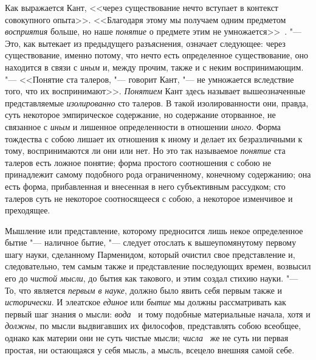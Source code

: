 Как выражается Кант, <<через существование нечто вступает в контекст
совокупного опыта>>. <<Благодаря этому мы получаем одним предметом
{\em восприятия} больше, но наше
{\em понятие} о предмете этим не
умножается>>~. "--- Это, как вытекает из предыдущего
разъяснения, означает следующее: через существование, именно потому, что
нечто есть определенное существование, оно находится в связи с
{\em иным} и, между прочим, также и с неким
воспринимающим. "--- <<Понятие ста талеров, "--- говорит Кант, "--- не умножается
вследствие того, что их воспринимают>>. {\em Понятием}
Кант здесь называет вышеозначенные представляемые
{\em изолированно} сто талеров. В такой изолированности
они, правда, суть некоторое эмпирическое содержание, но содержание
оторванное, не связанное с {\em иным} и лишенное
определенности в отношении {\em иного}. Форма
тождества с собою лишает их отношения к иному и делает их безразличными к
тому, воспринимаются ли они или нет. Но это так называемое
{\em понятие} ста талеров есть ложное понятие; форма
простого соотношения с собою не принадлежит самому подобного рода
ограниченному, конечному содержанию; она есть форма, прибавленная и
внесенная в него субъективным рассудком; сто талеров суть не некоторое
соотносящееся с собою, а некоторое изменчивое и преходящее.

Мышление или представление, которому предносится лишь некое определенное
бытие "--- наличное бытие, "--- следует отослать к вышеупомянутому первому шагу
науки, сделанному Парменидом, который очистил свое представление и,
следовательно, тем самым также и представление последующих времен, возвысил
его до {\em чистой мысли}, до бытия как такового, и
этим создал стихию науки. "--- То, что является
{\em первым в науке}, должно было явить себя первым
также и {\em исторически}. И элеатское
{\em единое} или {\em бытие} мы
должны рассматривать как первый шаг знания о мысли:
{\em вода}~ и тому
подобные материальные начала, хотя и {\em должны}, по
мысли выдвигавших их философов, представлять собою всеобщее, однако как
материи они не суть чистые мысли;
{\em числа}~ же не суть ни первая
простая, ни остающаяся у себя мысль, а мысль, всецело внешняя самой себе.

